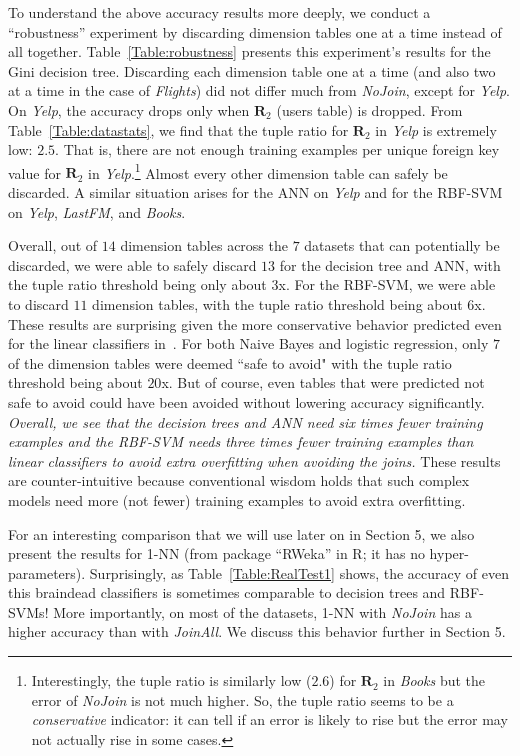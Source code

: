 \documentclass{vldb}
\begin{document}
To understand the above accuracy results more deeply, we conduct a ``robustness'' experiment by discarding dimension tables one at a time instead of all together. 
Table~\ref{Table:robustness} presents this experiment's results for the Gini decision tree.
Discarding each dimension table one at a time (and also two at a time in the case of \textit{Flights}) did not differ much from \textit{NoJoin}, except for \textit{Yelp}.
On \textit{Yelp}, the accuracy drops only when $\textbf{R}_2$ (users table) is dropped. 
From Table~\ref{Table:datastats}, we find that the tuple ratio for $\textbf{R}_2$ in \textit{Yelp} is extremely low: $2.5$. 
That is, there are not enough training examples per unique foreign key value for $\textbf{R}_2$ in \textit{Yelp}.\footnote{Interestingly, 
the tuple ratio is similarly low ($2.6$) for $\textbf{R}_2$ in \textit{Books} but the error of \textit{NoJoin} is not much higher. So, the tuple 
ratio seems to be a \textit{conservative} indicator: it can tell if an error is likely to rise but the error may not actually rise in some cases.}
Almost every other dimension table can safely be discarded. A similar situation arises for the ANN on \textit{Yelp} and for the
 RBF-SVM on \textit{Yelp}, \textit{LastFM}, and \textit{Books}. 

Overall, out of $14$ dimension tables across the $7$ datasets that can potentially be discarded, we were able to safely discard $13$ for the 
decision tree and ANN, with the tuple ratio threshold being only about $3$x. For the RBF-SVM, we were able to discard $11$ dimension tables, 
with the tuple ratio threshold being about $6$x.
These results are surprising given the more conservative behavior predicted even for the linear classifiers in~\cite{hamlet}. For both Naive Bayes 
and logistic regression, only $7$ of the dimension tables were deemed ``safe to avoid" with the tuple ratio threshold being about $20$x. 
But of course, even tables that were predicted not safe to avoid could have been avoided without lowering accuracy significantly.
\textit{Overall, we see that the decision trees and ANN need six times \textit{fewer} training examples and the RBF-SVM needs three times fewer 
training examples than linear classifiers to avoid extra overfitting when avoiding the joins.} These results are counter-intuitive because conventional 
wisdom holds that such complex models need more (not fewer) training examples to avoid extra overfitting.

For an interesting comparison that we will use later on in Section 5, we also present the results for 1-NN (from package ``RWeka'' in R; it has no 
hyper-parameters). Surprisingly, as Table~\ref{Table:RealTest1} shows, the accuracy of even this braindead classifiers is sometimes comparable to 
decision trees and RBF-SVMs! More importantly, on most of the datasets, 1-NN with \textit{NoJoin} has a higher accuracy than with \textit{JoinAll}. 
We discuss this behavior further in Section 5.
\end{document}
